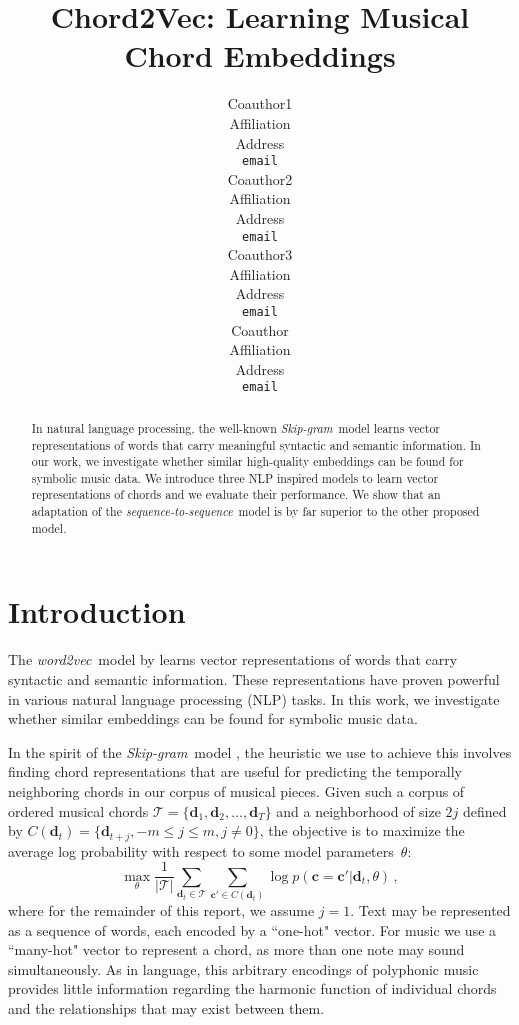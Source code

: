\documentclass{article}
\title{Chord2Vec: Learning  Musical Chord Embeddings}
\author{
   Coauthor1 \\
   Affiliation \\
   Address \\
   \texttt{email} \\
   \And
   Coauthor2 \\
   Affiliation \\
   Address \\
   \texttt{email} \\
   \AND
   Coauthor3 \\
   Affiliation \\
   Address \\
   \texttt{email} \\
  \And
   Coauthor \\
   Affiliation \\
   Address \\
   \texttt{email} \\
}
\newcommand{\T}{\mathcal{T}}
\newcommand{\boldc}{\boldsymbol c}
\newcommand{\boldd}{\boldsymbol d}
\newcommand{\skipgram}{\textit{Skip-gram}}
\newcommand{\wordtovec}{\textit{word2vec}}
\newcommand{\seqtoseq}{\textit{sequence-to-sequence}}
\begin{document}

\maketitle

\begin{abstract}
  In natural language processing, the well-known \skipgram\ model learns vector representations of words that carry meaningful syntactic and semantic information. In our work, we investigate whether similar high-quality embeddings can be found for symbolic music data. We introduce three NLP inspired models to learn vector representations of chords and we evaluate their performance. We show that an adaptation of the \seqtoseq\ model is by far superior to the other proposed model. 
  
\end{abstract}

\section{Introduction}

The \wordtovec\ model by \citet{mik2013} learns vector representations of words that carry syntactic and semantic information. These representations have proven powerful in various natural language processing (NLP) tasks. In this work, we investigate whether similar embeddings can be found for symbolic music data. %

In the spirit of the \skipgram\ model \citep{mik2013}, the heuristic we use to achieve this involves finding chord representations that are useful for predicting the temporally neighboring chords in our corpus of musical pieces. Given such a corpus of ordered musical chords  $\T = \{\boldd_1, \boldd_2, \ldots, \boldd_T\}$ and a neighborhood of size $2j$ defined by $ C(\boldd_t) = \{\boldd_{t+j}, -m \leq j \leq m , j \neq 0\}$, the objective is to maximize the average log probability with respect to some model parameters~$\theta$:
%
\begin{equation}
\max_{\theta} \frac{1}{|\T|}\sum_{\boldd_t \in \T} \sum_{\boldc' \in C(\boldd_t)} \log p(\boldc = \boldc'|\boldd_t, \theta)
 \,,
\label{eq:c2v_obj}
\end{equation} 
%
where for the remainder of this report, we assume $j=1$.
Text may be represented as a sequence of words, each encoded by a ``one-hot" vector. For music we use a ``many-hot" vector to represent a chord, as more than one note may sound simultaneously. As in language, this arbitrary encodings of polyphonic music provides little information regarding the harmonic function of individual chords and the relationships that may exist between them. 
\end{document}

